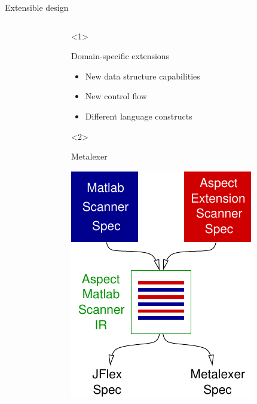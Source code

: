 \begin{frame}[t]{Extensible design}
\begin{columns}[T]
\begin{column}{5cm}
    \end{column}
    \begin{column}{5cm}
      \begin{onlyenv}<1>
        \begin{block}{Domain-specific extensions}
          \begin{itemize}
          \item New data structure capabilities
          \item New control flow
          \item Different language constructs
          \end{itemize}
        \end{block}
      \end{onlyenv}
      \begin{onlyenv}<2>
        \begin{block}{Metalexer
          \vspace{1ex}}
          \begin{center}
            \includegraphics[scale=0.7]{images/metalexer.pdf}
          \end{center}


\end{block}
\end{onlyenv}
\end{column}
\end{columns}
\end{frame}
